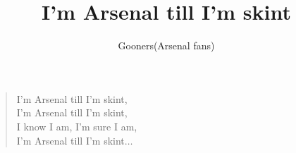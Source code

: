 \documentclass[a4paper,12pt]{article}
\title{I'm Arsenal till I'm skint}
\author{Gooners(Arsenal fans)}
\date{}
\begin{document}
	
	\maketitle
	
	\begin{verse}
		
		I'm Arsenal till I'm skint, \\
		I'm Arsenal till I'm skint, \\
		I know I am, I'm sure I am, \\
		I'm Arsenal till I'm skint$\ldots$
		
	\end{verse}
	
\end{document}
